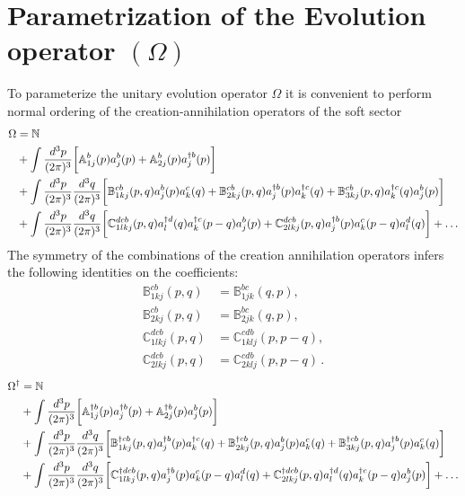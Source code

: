 \documentclass[10pt]{article}
\def\mf#1{\mathbb{#1}}
\numberwithin{equation}{section}
\begin{document}
\section{Parametrization of the Evolution operator $(\Omega)$}
To parameterize the unitary evolution operator $\Omega$ it is convenient to perform normal ordering of the creation-annihilation operators of the soft sector  
\begin{align}\label{Eq:OmegaExp}
    \Omega  & = \mf{N} \notag \\ & +
                \int \frac{d^3p}{(2\pi)^3} 
                \bigg[ 
                   \mf{A}^{b}_{1j}(p)a^{b}_{j}(p) 
                +  \mf{A}^{b}_{2j} (p) a^{\dagger b}_{j}(p)\bigg] \notag \\ & 
               +\int \frac{d^3p}{(2\pi)^3} \frac{d^3q}{(2\pi)^3} 
               \bigg[\mf{B}^{cb}_{1kj}(p,q) a^{b}_{j}(p)a^{c}_{k}(q) 
                   + \mf{B}^{cb}_{2kj}(p,q) a^{\dagger b}_{j}(p)a^{\dagger c}_{k}(q)
               + \mf{B}^{cb}_{3kj} (p,q) a^{\dagger c}_{k}(q)a^{b}_{j}(p)
               \bigg] \notag \\ & 
               + \int 
               \frac{d^3p}{(2\pi)^3} \frac{d^3q}{(2\pi)^3} 
               \bigg[
                \mf{C}^{ dcb}_{1lkj}(p,q) a^{\dagger d}_{l}(q)  a^{\dagger c}_{k}(p-q)  a^{b}_{j}(p)
               + \mf{C}^{dcb}_{2lkj}(p,q) a^{\dagger b}_{j}(p) a^{c}_{k}(p-q) a^{d}_{l}(q)\bigg] +\ldots
\end{align}
The symmetry of the combinations of the creation annihilation operators infers the following identities on the coefficients: 
\begin{align}
    \mf{B}^{cb}_{1kj}(p,q) &= \mf{B}^{bc}_{1jk}(q,p), \\   
    \mf{B}^{cb}_{2kj}(p,q) &= \mf{B}^{bc}_{2jk}(q,p),  \\ 
    \mf{C}^{ dcb}_{1lkj}(p,q) & = \mf{C}^{ cdb}_{1klj}(p,p-q), \\  
    \mf{C}^{ dcb}_{2lkj}(p,q) & = \mf{C}^{ cdb}_{2klj}(p,p-q)\,.   
\end{align}
\begin{align}
    \Omega^{\dagger}  & = \mf{N} \notag \\ & +
                \int \frac{d^3p}{(2\pi)^3} 
                \bigg[ 
                   \mf{A}^{\dagger b}_{1j}(p)a^{\dagger b}_{j}(p) 
                +  \mf{A}^{\dagger b}_{2j} (p) a^{b}_{j}(p)\bigg] \notag \\ & 
               +\int \frac{d^3p}{(2\pi)^3} \frac{d^3q}{(2\pi)^3} 
               \bigg[\mf{B}^{\dagger cb}_{1kj}(p,q) a^{\dagger b}_{j}(p)a^{\dagger c}_{k}(q) 
                   + \mf{B}^{\dagger cb}_{2kj}(p,q) a^{b}_{j}(p)a^{c}_{k}(q)
               + \mf{B}^{\dagger cb}_{3kj} (p,q) a^{\dagger b}_{j}(p)a^{c}_{k}(q)
               \bigg] \notag \\ & 
               + \int 
               \frac{d^3p}{(2\pi)^3} \frac{d^3q}{(2\pi)^3} 
               \bigg[
                \mf{C}^{\dagger dcb}_{1lkj}(p,q) a^{\dagger b}_{j}(p) a^{c}_{k}(p-q)  a^{d}_{l}(q)
               + \mf{C}^{\dagger dcb}_{2lkj}(p,q) a^{\dagger d}_{l}(q) a^{\dagger c}_{k}(p-q)a^{b}_{j}(p) \bigg] +\ldots
\end{align}
\end{document}
